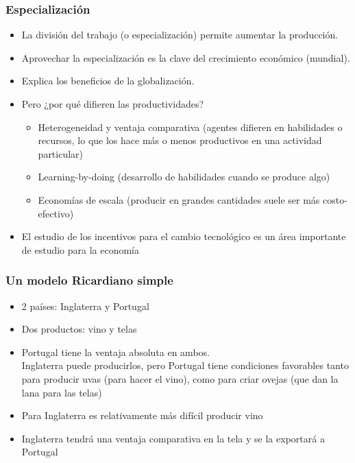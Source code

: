 \documentclass{beamer}
\begin{document}
\begin{frame}
\frametitle{Especialización}
\begin{itemize}
    \item La división del trabajo (o especialización) permite aumentar la producción.
     \item Aprovechar la especialización es la clave del crecimiento económico (mundial).
     \item  Explica los beneficios de la globalización.
  \item Pero ¿por qué difieren las productividades?

    \begin{itemize}\vspace{2mm}
        \item Heterogeneidad y ventaja comparativa (agentes difieren en habilidades o recursos, lo que los hace más o menos productivos en una actividad particular)
        \item Learning-by-doing (desarrollo de habilidades cuando se produce algo) \vspace{2mm}
        \item Economías de escala (producir en grandes cantidades suele ser más costo-efectivo) \vspace{2mm}
    
    \end{itemize}
        \item El estudio de los incentivos para el cambio tecnológico es un área importante de estudio para la economía
\end{itemize} 
\end{frame}

\begin{frame}
\frametitle{Un modelo Ricardiano simple}
\begin{itemize}
    \item 2 países: Inglaterra y Portugal\vspace{2mm}
    \item Dos productos: vino y telas\vspace{2mm}
    \item Portugal tiene la ventaja absoluta en ambos. \\
    Inglaterra puede producirlos, pero Portugal tiene condiciones favorables tanto para producir uvas (para hacer el vino), como para criar ovejas (que dan la lana para las telas)\vspace{2mm}
    \item Para Inglaterra es relativamente más difícil producir vino\vspace{2mm}
    \item Inglaterra tendrá una ventaja comparativa en la tela y se la exportará a Portugal
\end{itemize} 
\end{frame}
\end{document}
